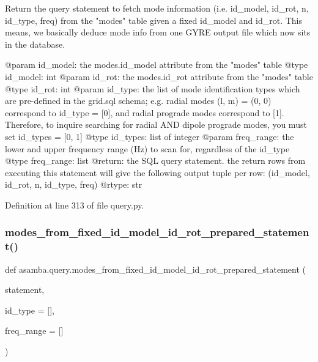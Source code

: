 \begin{DoxyVerb}Return the query statement to fetch mode information (i.e. id_model, id_rot, n, id_type, freq)
from the "modes" table given a fixed id_model and id_rot. This means, we basically deduce mode info
from one GYRE output file which now sits in the database.

@param id_model: the modes.id_model attribute from the "modes" table
@type id_model: int
@param id_rot: the modes.id_rot attribute from the "modes" table
@type id_rot: int
@param id_type: the list of mode identification types which are pre-defined in the grid.sql schema;
       e.g. radial modes (l, m) = (0, 0) correspond to id_type = [0], and radial prograde modes 
       correspond to [1]. Therefore, to inquire searching for radial AND dipole prograde modes, you
       must set id_types = [0, 1]
@type id_types: list of integer
@param freq_range: the lower and upper frequency range (Hz) to scan for, regardless of the id_type
@type freq_range: list
@return: the SQL query statement. the return rows from executing this statement will give the following
       output tuple per row: (id_model, id_rot, n, id_type, freq)
@rtype: str
\end{DoxyVerb}
 

Definition at line 313 of file query.\+py.

\mbox{\label{namespaceasamba_1_1query_a48eceec8dc6ed89e2916e155f3cd16a6}} 
\subsubsection{\texorpdfstring{modes\+\_\+from\+\_\+fixed\+\_\+id\+\_\+model\+\_\+id\+\_\+rot\+\_\+prepared\+\_\+statement()}{modes\_from\_fixed\_id\_model\_id\_rot\_prepared\_statement()}}
{\footnotesize\ttfamily def asamba.\+query.\+modes\+\_\+from\+\_\+fixed\+\_\+id\+\_\+model\+\_\+id\+\_\+rot\+\_\+prepared\+\_\+statement (\begin{DoxyParamCaption}\item[{}]{statement,  }\item[{}]{id\+\_\+type = {\ttfamily \mbox{[}\mbox{]}},  }\item[{}]{freq\+\_\+range = {\ttfamily \mbox{[}\mbox{]}} }\end{DoxyParamCaption})}

